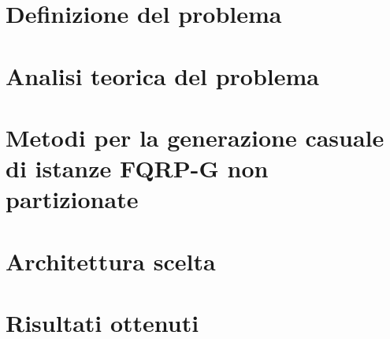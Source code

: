 \section{Definizione del problema}


\section{Analisi teorica del problema}


\section{Metodi per la generazione casuale di istanze FQRP-G non partizionate}


\section{Architettura scelta}


\section{Risultati ottenuti}


